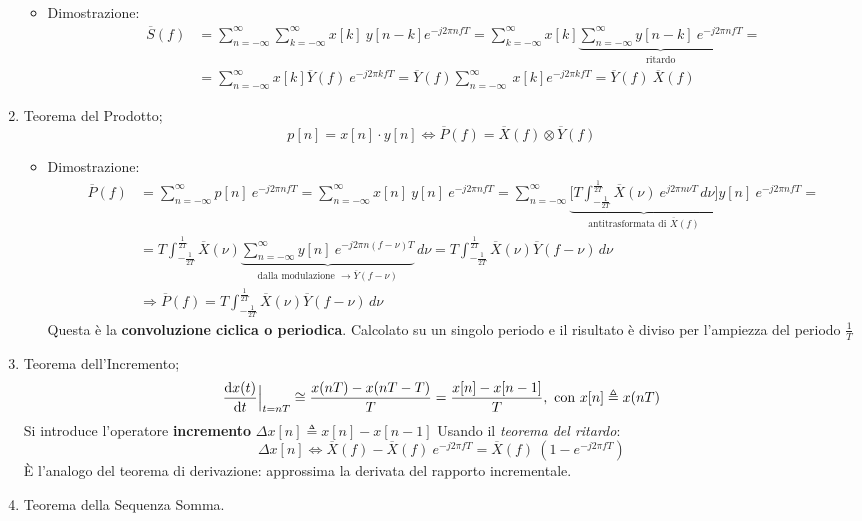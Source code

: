 \documentclass[
]{article}
\providecommand{\tightlist}{%
  \setlength{\itemsep}{0pt}\setlength{\parskip}{0pt}}
\begin{document}
\begin{enumerate}
  \begin{itemize}
  \tightlist
  \item
    Dimostrazione: \begin{align*}
     \overline{S}(f) &= \sum_{n=-\infty}^{\infty} \sum_{k=-\infty}^{\infty} x[k]\ y[n-k] e^{-j2\pi nfT} = \sum_{k=-\infty}^{\infty} x[k] \underbrace{\sum_{n=-\infty}^{\infty}y[n-k]\ e^{-j2\pi nfT}}_{\text{ritardo}}= \\
     &= \sum_{n=-\infty}^{\infty} x[k] \overline{Y}(f) \ e^{-j2\pi kfT} = \overline{Y}(f)  \sum_{n=-\infty}^{\infty} \ x[k]  e^{-j2\pi kfT} =\overline{Y}(f) \ \overline{X}(f)
     \end{align*}
  \end{itemize}
\item
  Teorema del Prodotto; \[
   p[n]=x[n]\cdot y[n] \Longleftrightarrow \overline{P}(f) = \overline{X}(f) \otimes \overline{Y}(f)
   \]

  \begin{itemize}
  \tightlist
  \item
    Dimostrazione: \begin{align*}
      \overline{P}(f)&=\sum_{n=-\infty}^{\infty} p[n] \ e^{-j2\pi nfT} =  \sum_{n=-\infty}^{\infty} x[n] \ y[n] \ e^{-j2\pi nfT} = \sum_{n=-\infty}^{\infty}
      \underbrace{\Big[T\int_{-\frac{1}{2T}}^{\frac{1}{2T}} \overline{X}(\nu)\ e^{j2\pi n\nu T} \,d\nu\Big]}_{\text{antitrasformata di }\overline{X}(f)} y[n] \ e^{-j2\pi nfT} = \\
      &= T \int_{-\frac{1}{2T}}^{\frac{1}{2T}} \overline{X}(\nu)  \underbrace{\sum_{n=-\infty}^{\infty} y[n] \ e^{-j2\pi n(f-\nu)T}}_{\text{dalla modulazione }\to \overline{Y}(f-\nu)} \,d\nu=
      T \int_{-\frac{1}{2T}}^{\frac{1}{2T}} \overline{X}(\nu) \overline{Y}(f-\nu)\,d\nu  \\
     &\Rightarrow \overline{P}(f) = T \int_{-\frac{1}{2T}}^{\frac{1}{2T}} \overline{X}(\nu) \overline{Y}(f-\nu)\,d\nu
     \end{align*} Questa è la \textbf{convoluzione ciclica o periodica}.
    Calcolato su un singolo periodo e il risultato è diviso per
    l'ampiezza del periodo \(\frac{1}{T}\)
  \end{itemize}
\item
  Teorema dell'Incremento; \[
   \odv{x(t)}{t}\Big|_{t=nT} \cong \frac{x(nT)-x(nT-T)}{T} = \frac{x[n]-x[n-1]}{T}, \text{ con } x[n] \triangleq x(nT)  
   \] Si introduce l'operatore \textbf{incremento}
  \(\Delta x[n] \triangleq x[n] - x[n-1]\) \newline Usando il
  \emph{teorema del ritardo}: \[
   \Delta x[n] \Longleftrightarrow \overline{X}(f) - \overline{X}(f)\ e^{-j2\pi fT} = \overline{X}(f) \ (1-e^{-j2\pi fT})
   \] È l'analogo del teorema di derivazione: approssima la derivata del
  rapporto incrementale.
\item
  Teorema della Sequenza Somma.


\end{enumerate}
\end{document}
